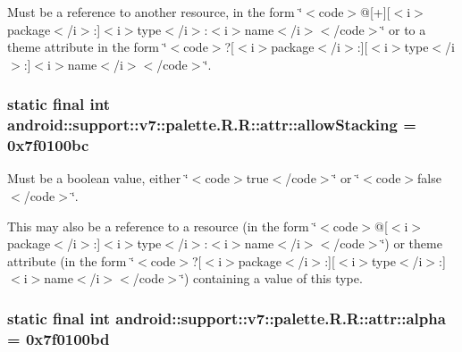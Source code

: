 Must be a reference to another resource, in the form \char`\"{}$<$code$>$@\mbox{[}+\mbox{]}\mbox{[}$<$i$>$package$<$/i$>$:\mbox{]}$<$i$>$type$<$/i$>$:$<$i$>$name$<$/i$>$$<$/code$>$\char`\"{} or to a theme attribute in the form \char`\"{}$<$code$>$?\mbox{[}$<$i$>$package$<$/i$>$:\mbox{]}\mbox{[}$<$i$>$type$<$/i$>$:\mbox{]}$<$i$>$name$<$/i$>$$<$/code$>$\char`\"{}. \hypertarget{classandroid_1_1support_1_1v7_1_1palette_1_1_r_1_1attr_53822cb25566373231197ddec536b38e}{
\subsubsection[{allowStacking}]{\setlength{\rightskip}{0pt plus 5cm}static final int android::support::v7::palette.R.R::attr::allowStacking = 0x7f0100bc}}
\label{classandroid_1_1support_1_1v7_1_1palette_1_1_r_1_1attr_53822cb25566373231197ddec536b38e}


Must be a boolean value, either \char`\"{}$<$code$>$true$<$/code$>$\char`\"{} or \char`\"{}$<$code$>$false$<$/code$>$\char`\"{}. 

This may also be a reference to a resource (in the form \char`\"{}$<$code$>$@\mbox{[}$<$i$>$package$<$/i$>$:\mbox{]}$<$i$>$type$<$/i$>$:$<$i$>$name$<$/i$>$$<$/code$>$\char`\"{}) or theme attribute (in the form \char`\"{}$<$code$>$?\mbox{[}$<$i$>$package$<$/i$>$:\mbox{]}\mbox{[}$<$i$>$type$<$/i$>$:\mbox{]}$<$i$>$name$<$/i$>$$<$/code$>$\char`\"{}) containing a value of this type. \hypertarget{classandroid_1_1support_1_1v7_1_1palette_1_1_r_1_1attr_1e85e04e4dba78729c1d2675497a2413}{
\subsubsection[{alpha}]{\setlength{\rightskip}{0pt plus 5cm}static final int android::support::v7::palette.R.R::attr::alpha = 0x7f0100bd}}
\label{classandroid_1_1support_1_1v7_1_1palette_1_1_r_1_1attr_1e85e04e4dba78729c1d2675497a2413}


